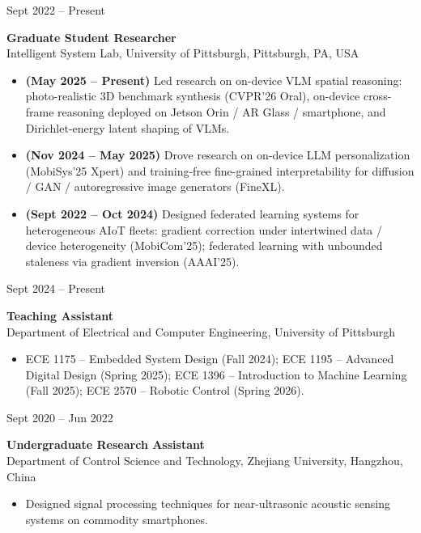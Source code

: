 \documentclass[11pt, letterpaper]{article}
\newenvironment{datedentry}[1]{%
  \par\noindent
  \begin{minipage}[t]{2.8cm}\raggedright\small #1\end{minipage}%
  \hspace{0.3cm}%
  \begin{minipage}[t]{\dimexpr\linewidth-3.1cm\relax}\raggedright
}{%
  \end{minipage}\par\medskip
}
\begin{document}
\begin{datedentry}{Sept 2022 -- Present}
\textbf{Graduate Student Researcher}\\
Intelligent System Lab, University of Pittsburgh, Pittsburgh, PA, USA
\begin{itemize}[leftmargin=1.1em, itemsep=2pt, topsep=3pt]
  \item \textbf{(May 2025 -- Present)} Led research on on-device VLM spatial reasoning: photo-realistic 3D benchmark synthesis (CVPR'26 Oral), on-device cross-frame reasoning deployed on Jetson Orin / AR Glass / smartphone, and Dirichlet-energy latent shaping of VLMs.
  \item \textbf{(Nov 2024 -- May 2025)} Drove research on on-device LLM personalization (MobiSys'25 Xpert) and training-free fine-grained interpretability for diffusion / GAN / autoregressive image generators (FineXL).
  \item \textbf{(Sept 2022 -- Oct 2024)} Designed federated learning systems for heterogeneous AIoT fleets: gradient correction under intertwined data / device heterogeneity (MobiCom'25); federated learning with unbounded staleness via gradient inversion (AAAI'25).
\end{itemize}
\end{datedentry}

\begin{datedentry}{Sept 2024 -- Present}
\textbf{Teaching Assistant}\\
Department of Electrical and Computer Engineering, University of Pittsburgh
\begin{itemize}[leftmargin=1.1em, itemsep=1pt, topsep=2pt]
  \item ECE 1175 -- Embedded System Design (Fall 2024); ECE 1195 -- Advanced Digital Design (Spring 2025); ECE 1396 -- Introduction to Machine Learning (Fall 2025); ECE 2570 -- Robotic Control (Spring 2026).
\end{itemize}
\end{datedentry}

\begin{datedentry}{Sept 2020 -- Jun 2022}
\textbf{Undergraduate Research Assistant}\\
Department of Control Science and Technology, Zhejiang University, Hangzhou, China
\begin{itemize}[leftmargin=1.1em, itemsep=2pt, topsep=2pt]
  \item Designed signal processing techniques for near-ultrasonic acoustic sensing systems on commodity smartphones.
\end{itemize}
\end{datedentry}
\end{document}
